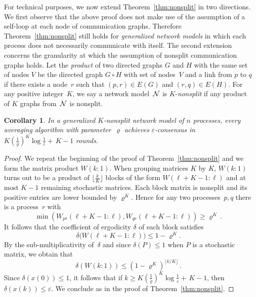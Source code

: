 \documentclass[a4paper]{article}
\theoremstyle{newthm}
\newtheorem{cor}[thm]{Corollary}
\renewcommand{\leq}{\leqslant}
\renewcommand{\ge}{\geqslant}
\renewcommand{\geq}{\geqslant}
\begin{document}
For technical purposes, we now extend Theorem~\ref{thm:nonsplit} in two directions.
We first observe that the 
	above proof does not make use of the assumption of a self-loop at each node of
	communication graphs.
Therefore Theorem~\ref{thm:nonsplit}  still holds for {\em generalized network models\/} 
	in which each process does not necessarily communicate with itself.
The second extension concerns the granularity at which the assumption of nonsplit 
	communication graphs holds.
Let the {\em product\/} of two directed graphs $G$ and $H$ with the same set of nodes $V$
	be the directed graph  $G \circ H$ with set of nodes~$V$ and a  link from $p$ to $q$ 
	 if there exists a node~$r$ such that $(p,r)\in E(G)$ and $ (r,q) \in E(H)$.
For any positive integer~$K$, we say a network model~${\cal N}$ is $K$-{\em nonsplit\/} if any product of $K$
	graphs from~${\cal N}$ is nonsplit. 

\begin{cor}\label{cor:nonsplit}
In a generalized $K$-nonsplit network model of $n$ processes, every averaging algorithm with parameter~$\varrho$
	achieves $\varepsilon$-consensus in 
	$ K \left (\frac{1 }{\varrho}\right )^{K} \log \frac{1}{\varepsilon} + \, K -1$ rounds.
\end{cor}

\begin{proof}
We repeat the beginning of the proof of Theorem~\ref{thm:nonsplit}
	and we form the matrix product $W(k:1)$.
When grouping matrices $K$ by $K$,  $W(k:1)$ turns out to be  a product
	of $\lfloor \frac{k}{K} \rfloor$ blocks of the form $W(\ell +K -1 :\ell)$
     and at most $K-1$ remaining stochastic matrices.
Each block matrix is nonsplit and 
	its positive entries are lower bounded by $\varrho^K$.
Hence for any two processes~$p,q$ there is a process~$r$ with  
	$$ \min (W_{p r}( \ell +K - 1: \ell ), W_{q r}( \ell +K - 1: \ell )) \ge \varrho^K \,.$$
It follows that the coefficient of ergodicity $\delta$ of each block  satisfies
	$$
	\delta \big( W( \ell +K - 1: \ell) \big)  \leq 1 - \varrho^K .
	$$
By the sub-multiplicativity of~$\delta$ and since  $\delta(P)\leq 1$ when 
	$P$ is a stochastic matrix, 
     we obtain that 
	$$ \delta \left( W( k:1)\right) \leq \left (1 - \varrho^{K} \right)^{\lfloor k/K\rfloor} \, .$$
Since $\delta \left ( x(0) \right )\leq 1$, it follows  that 
     if $k \geq K \left (\frac{1 }{\varrho}\right )^{K} \log \frac{1}{\varepsilon} + \, K-1$,
     then $ \delta \left( x(k)\right) \leq\varepsilon$.
We conclude as in the proof of Theorem~\ref{thm:nonsplit}.
\end{proof}
\end{document}
